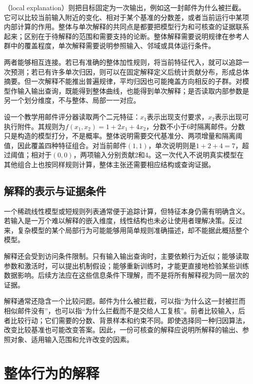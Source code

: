 （local explanation）则把目标固定为一次输出，例如这一封邮件为什么被拦截。它可以比较当前输入附近的变化、相对于某个基准的分数差，或者当前运行中某项内部计算的作用。整体与单次解释的共同点是都要把模型行为和可核查的证据联系起来；区别在于待解释的范围和需要支持的论断。整体解释需要说明规律在参考人群中的覆盖程度，单次解释需要说明参照输入、邻域或具体运行条件。

两者能够相互连接。若已有准确的整体加性规则，将当前特征代入，就可以追踪一次预测；若已有许多单次归因，则可以在固定解释定义后统计贡献分布，形成总体摘要。但一次解释不能推出普遍规律，平均归因也可能掩盖方向相反的子群。对模型作输入输出查询，既能得到整体曲线，也能得到单次解释；是否读取内部参数是另一个划分维度，不与整体、局部一一对应。

\begin{example}[同一规则的整体与单次说明]
\label{ex:interpretability-global-local}
设一个教学用邮件评分器读取两个二元特征：$x_1$表示出现支付要求，$x_2$表示出现可执行附件。其规则为$f(x_1,x_2)=1+2x_1+4x_2$，分数不小于6时隔离邮件。分数只是构造的模型打分，不是概率。整体说明需要交代基准分、两项增量和隔离阈值，因此覆盖四种特征组合。对当前邮件$(1,1)$，单次说明则是$1+2+4=7$，超过阈值；相对于$(0,0)$，两项输入分别贡献2和4。这一次代入不说明真实模型在其他组合上也按同样规则计算，整体主张还需要相应结构或查询证据。
\end{example}

\subsection{解释的表示与证据条件}

一个稀疏线性模型或短规则列表通常便于追踪计算，但特征本身仍需有明确含义。若输入是一万个难以解释的嵌入维度，线性结构也未必让使用者理解决策。反过来，复杂模型的某个局部行为可能能够用简单规则准确描述，却不能据此概括整个模型。

解释还会受到访问条件限制。只有输入输出查询时，主要依赖行为近似；能够读取参数和激活时，可以提出机制假设；能够重新训练时，才能更直接地检验某些训练数据影响。后续方法应在这些信息条件下理解，而不是将所有解释视为同一层次的证据。

解释通常还隐含一个比较问题。邮件为什么被拦截，可以指“为什么这一封被拦而相似邮件没有”，也可以指“为什么拦截而不是交给人工复核”。前者比较输入，后者比较行动；它们需要的分数、背景样本和约束不同。即使选择同一种归因算法，改变比较基准也可能改变答案。因此，一份可核查的解释应说明所解释的输出、参照对象、适用输入范围和允许改变的因素。

\section{整体行为的解释}
\label{sec:interpretability-global}

